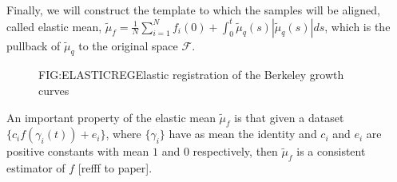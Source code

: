 Finally, we will construct the template to which the samples will be aligned,
called elastic mean,
$\tilde \mu_f = \frac{1}{N} \sum_{i=1}^N f_i(0) +
\int_0^t \tilde \mu_q(s) | \tilde \mu_q(s)| ds$,
which is the pullback of $\tilde \mu_q$ to the original space $\mathscr{F}$.

\begin{figure}[Elastic registration of the Berkeley growth curves]{FIG:ELASTICREG}{Elastic registration of the Berkeley growth curves}
   \quad
\end{figure}

An important property of the elastic mean
$\tilde \mu_f$ is that given a dataset $\{c_i f(\gamma_i(t)) + e_i\}$, where
$\{\gamma_i\}$ have as mean the identity and $c_i$ and $e_i$ are positive
constants with mean $1$ and $0$ respectively, then $\tilde \mu_f$ is a
consistent estimator of $f$ [refff to paper].
